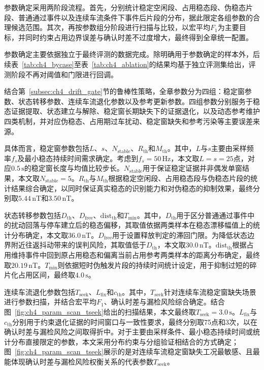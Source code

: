 \documentclass{xdupgthesis}
\begin{document}
参数确定采用两阶段流程。首先，分别统计稳定空闲段、占用稳态段、伪稳态片段、普通通过事件以及连续车流条件下事件后片段的分布，据此限定各组参数的合理候选范围。其次，再按参数组分阶段进行扫描与比较，以宏平均$F_1$为主要目标，并同时约束占用边界误差与确认时差不过度增大，最终得到全章统一配置。

参数确定主要依据独立于最终评测的数据完成。除明确用于参数确定的样本外，后续表~\ref{tab:ch4_bycase}至表~\ref{tab:ch4_ablation}的结果均基于独立评测集给出，评测阶段不再对阈值和门限进行回调。

结合第~\ref{subsec:ch4_drift_gate}节的鲁棒性策略，全章参数分为四组：稳定窗参数、状态转移参数、连续车流退化参数以及参考更新参数。四组参数分别服务于稳态证据提取、状态建立与解除、稳定窗长期缺失下的证据退化，以及动态参考维护四类机制，并对应伪稳态、占用期过车扰动、稳定窗缺失和参考污染等主要误差来源。

具体而言，稳定窗参数包括$L$、$s$、$N_{\mathrm{stable}}$、$R_{\mathrm{th}}$和$M_{\mathrm{th}}$。其中，$L$与$s$主要由采样频率$f_s$及最小稳态持续时间需求确定。考虑到$f_s=50\,\mathrm{Hz}$，本文取$L=s=25$点，对应$0.5\,\mathrm{s}$的稳定窗长度与均值比较步长。$N_{\mathrm{stable}}$用于保证稳定证据并非偶发单窗结果，本文取$N_{\mathrm{stable}}=5$。$R_{\mathrm{th}}$与$M_{\mathrm{th}}$根据稳定空闲段、占用稳态段与伪稳态片段的统计结果综合确定，以同时保证真实稳态的识别能力和对伪稳态的抑制效果，最终分别取$5.44\,\mathrm{nT}$和$3.50\,\mathrm{nT}$。

状态转移参数包括$D_{\mathrm{th}}$、$D_{\mathrm{free}}$、$\mathrm{dist}_{\mathrm{th}}$和$T_{\min}$。其中，$D_{\mathrm{th}}$用于区分普通通过事件中的扰动回落与停车建立后的稳态偏移，其取值依据两类样本在稳态漂移幅值上的统计分布确定，本文取$36.0\,\mathrm{nT}$。$D_{\mathrm{free}}$用于设置释放判定的滞回门限。为降低状态边界附近往返抖动带来的误判风险，其取值低于$D_{\mathrm{th}}$，本文取$30.0\,\mathrm{nT}$。$\mathrm{dist}_{\mathrm{th}}$根据占用维持事件中回到原占用稳态和偏离当前占用参考两类样本的距离分布确定，最终取$20.19\,\mathrm{nT}$。$T_{\min}$则依据短时伪触发片段的持续时间统计设定，用于抑制过短的碎片化占用区间，最终取$4.0\,\mathrm{s}$。

连续车流退化参数包括$T_{\mathrm{seek}}$、$L_{\mathrm{fix}}$和$c_{\mathrm{th}}$。其中，$T_{\mathrm{seek}}$针对连续车流稳定窗缺失场景进行参数扫描，并结合宏平均$F_1$、确认时差与漏检风险综合确定。结合图~\ref{fig:ch4_param_scan_tseek}给出的扫描结果，本文最终取$T_{\mathrm{seek}}=3.0\,\mathrm{s}$。$L_{\mathrm{fix}}$与$c_{\mathrm{th}}$分别用于约束退化证据的时间窗口与一致性要求，最终分别取75点和3次，以在确认时差与漏检风险之间取得折中。对于主要由采样条件、最小稳态持续时间或统计分布直接限定的参数，本文采用分布约束与分组验证相结合的方式确定；图~\ref{fig:ch4_param_scan_tseek}展示的是对连续车流稳定窗缺失工况最敏感、且最能体现确认时差与漏检风险权衡关系的代表参数$T_{\mathrm{seek}}$。
\end{document}
